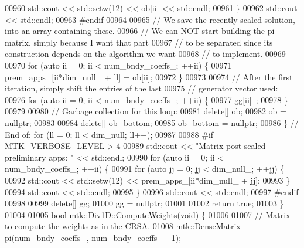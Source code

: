 \begin{DoxyCode}
{{00960       std::cout << std::setw(12) << ob[ii] << std::endl;
00961     \}
00962     std::cout << std::endl;
00963 \textcolor{preprocessor}{    #endif}
00964 
00965     \textcolor{comment}{// We save the recently scaled solution, into an array containing these.}
00966     \textcolor{comment}{// We can NOT start building the pi matrix, simply because I want that part}
00967     \textcolor{comment}{// to be separated since its construction depends on the algorithm we want}
00968     \textcolor{comment}{// to implement.}
00969 
00970     \textcolor{keywordflow}{for} (\textcolor{keyword}{auto} ii = 0; ii < num\_bndy\_coeffs\_; ++ii) \{
00971       prem\_apps\_[ii*dim\_null\_ + ll] = ob[ii];
00972     \}
00973 
00974     \textcolor{comment}{// After the first iteration, simply shift the entries of the last}
00975     \textcolor{comment}{// generator vector used:}
00976     \textcolor{keywordflow}{for} (\textcolor{keyword}{auto} ii = 0; ii < num\_bndy\_coeffs\_; ++ii) \{
00977       gg[ii]--;
00978     \}
00979 
00980     \textcolor{comment}{// Garbage collection for this loop:}
00981     \textcolor{keyword}{delete}[] ob;
00982     ob = \textcolor{keyword}{nullptr};
00983 
00984     \textcolor{keyword}{delete}[] ob\_bottom;
00985     ob\_bottom = \textcolor{keyword}{nullptr};
00986   \} \textcolor{comment}{// End of: for (ll = 0; ll < dim\_null; ll++);}
00987 
00988 \textcolor{preprocessor}{  #if MTK\_VERBOSE\_LEVEL > 4}
00989   std::cout << \textcolor{stringliteral}{"Matrix post-scaled preliminary apps: "} << std::endl;
00990   \textcolor{keywordflow}{for} (\textcolor{keyword}{auto} ii = 0; ii < num\_bndy\_coeffs\_; ++ii) \{
00991     \textcolor{keywordflow}{for} (\textcolor{keyword}{auto} jj = 0; jj < dim\_null\_; ++jj) \{
00992       std::cout << std::setw(12) << prem\_apps\_[ii*dim\_null\_ + jj];
00993     \}
00994     std::cout << std::endl;
00995   \}
00996   std::cout << std::endl;
00997 \textcolor{preprocessor}{  #endif}
00998 
00999   \textcolor{keyword}{delete}[] gg;
01000   gg = \textcolor{keyword}{nullptr};
01001 
01002   \textcolor{keywordflow}{return} \textcolor{keyword}{true};
01003 \}
01004 
\hypertarget{mtk__div__1d_8cc_source_l01005}{}\hyperlink{classmtk_1_1Div1D_aaadd6a6e6836bb94841c4c35dffab828}{01005} \textcolor{keywordtype}{bool} \hyperlink{classmtk_1_1Div1D_aaadd6a6e6836bb94841c4c35dffab828}{mtk::Div1D::ComputeWeights}(\textcolor{keywordtype}{void}) \{
01006 
01007   \textcolor{comment}{// Matrix to compute the weights as in the CRSA.}
01008   \hyperlink{classmtk_1_1DenseMatrix}{mtk::DenseMatrix} pi(num\_bndy\_coeffs\_, num\_bndy\_coeffs\_ - 1);
}}
\end{DoxyCode}
